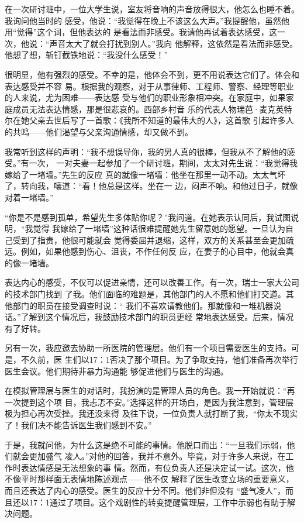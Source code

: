 \documentclass{ctexart}
\begin{document}
在一次研讨班中，一位大学生说，室友将音响的声音放得很大，他怎么也睡不着。我询问他当时的
感受，他说：``我觉得在晚上不该这么大声。''我提醒他，虽然他用``觉得''这个词，但他表达的
是看法而非感受。我请他再试着表达感受，这一次，他说：``声音太大了就会打扰到别人。''我向
他解释，这依然是看法而非感受。他想了想，斩钉截铁地说：``我没什么感受！''

很明显，他有强烈的感受。不幸的是，他体会不到，更不用说表达它们了。体会和表达感受并不容
易。根据我的观察，对于从事律师、工程师、警察、经理等职业的人来说，尤为困难------表达感
受与他们的职业形象相冲突。在家庭中，如果家庭成员无法表达情感，那是很悲哀的。西部乡村音
乐的代表人物瑞芭·麦克英特尔在她父亲去世后写了一首歌：《我所不知道的最伟大的人》，这首歌
引起许多人的共鸣------他们渴望与父亲沟通情感，却又做不到。

我常听到这样的声明：``我不想误导你，我的男人真的很棒，但我从不了解他的感受。''有一次，
一对夫妻一起参加了一个研讨班，期间，太太对先生说：``我觉得我嫁给了一堵墙。''先生的反应
真的就像一堵墙：他坐在那里一动不动。太太气坏了，转向我，嚷道：``看！他总是这样。坐在一
边，闷声不响。和他过日子，就像对着一堵墙。''

``你是不是感到孤单，希望先生多体贴你呢？''我问道。在她表示认同后，我试图说明，``我觉得
我嫁给了一堵墙''这种话很难提醒她先生留意她的愿望。一旦认为自己受到了指责，他很可能就会
觉得委屈并退缩，这样，双方的关系甚至会更加疏远。例如，如果他感到伤心、沮丧，不作任何反
应，在妻子的心目中，他就会真的像一堵墙。

表达内心的感受，不仅可以促进亲情，还可以改善工作。有一次，瑞士一家大公司的技术部门找到
了我。他们面临的难题是，其他部门的人不愿和他们打交道。其他部门的职员在接受调查时说：``
我们不喜欢请教他们。那就像和一堆机器说话。''了解到这个情况后，我鼓励技术部门的职员更经
常地表达感受。后来，情况有了好转。

另有一次，我应邀去协助一所医院的管理层。他们有一个项目需要医生的支持。可是，不久前，医
生们以17：1否决了那个项目。为了争取支持，他们准备再次举行医生会议。他们期待非暴力沟通能
够促进他们与医生的沟通。

在模拟管理层与医生的对话时，我扮演的是管理人员的角色。我一开始就说：``再一次提到这个项
目，我忐忑不安。''选择这样的开场白，是因为我注意到，管理层极为担心再次受挫。我还没来得
及往下说，一位负责人就打断了我，``你太不现实了！我们决不能告诉医生我们感到不安。''

于是，我就问他，为什么这是绝不可能的事情。他脱口而出：``一旦我们示弱，他们就会更加盛气
凌人。''对他的回答，我并不意外。毕竟，对于许多人来说，在工作时表达情感是无法想象的事
情。然而，有位负责人还是决定试一试。这次，他不像平时那样面无表情地陈述观点------他不仅
解释了医生改变立场的重要意义，而且还表达了内心的感受。医生的反应十分不同。他们非但没有
``盛气凌人''，而且还以17：1通过了项目。这个戏剧性的转变提醒管理层，工作中示弱也有助于解
决问题。
\end{document}
